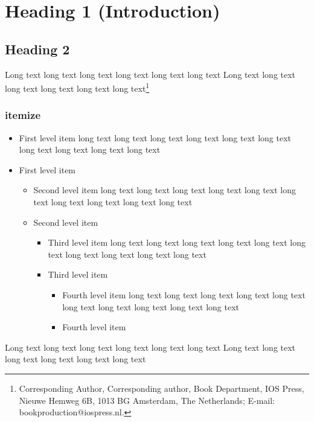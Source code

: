 \documentclass{akabook}
\theoremstyle{definition}
\begin{document}
\chapter{Heading 1 (Introduction)}

\lipsum[1]
\section{Heading 2}
Long text long text long text long text long text long text
Long text long text long text long text long text long text\footnote{Corresponding Author, Corresponding author, Book Department, IOS Press, Nieuwe Hemweg
6B, 1013 BG Amsterdam, The Netherlands; E-mail: bookproduction@iospress.nl.}



\subsection{itemize}
 \begin{itemize}
   \item First level item long text long text long text long text long text long text long text long text long text long text
   \item First level item
   \begin{itemize}
     \item Second level item long text long text long text long text long text long text long text 
long text long text long text
     \item Second level item
     \begin{itemize}
       \item Third level item long text long text long text long text long text long text long text 
long text long text long text
       \item Third level item
       \begin{itemize}
         \item Fourth level item long text long text long text long text long text long text long 
text long text long text long text
         \item Fourth level item
       \end{itemize}
     \end{itemize}
   \end{itemize}
 \end{itemize}

Long text long text long text long text long text long text
Long text long text long text long text long text long text
\end{document}
